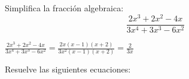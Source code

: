 \documentclass[addpoints,spanish, 12pt,a4paper]{exam}
\begin{document}
\begin{questions}
\question[2] Simplifica la fracción algebraica: $$\frac{2 x^{3} + 2 x^{2} - 4 x}{3 x^{4} + 3 x^{3} - 6 x^{2}}$$
\begin{solution} $\frac{2 x^{3} + 2 x^{2} - 4 x}{3 x^{4} + 3 x^{3} - 6 x^{2}}=\frac{2 x \left(x - 1\right) \left(x + 2\right)}{3 x^{2} \left(x - 1\right) \left(x + 2\right)}=\frac{2}{3 x}$  \end{solution}





\question Resuelve las siguientes ecuaciones: 
\end{questions}
\end{document}

